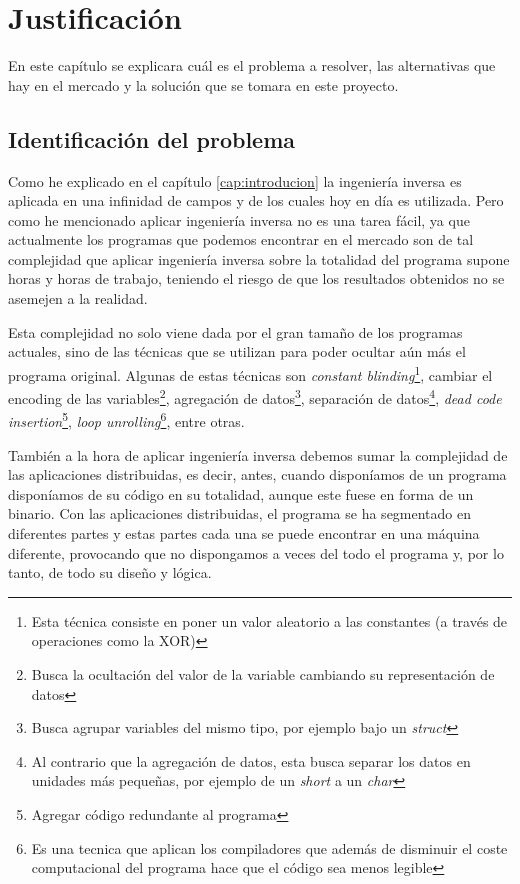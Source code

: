 \chapter{Justificación}
\label{cap:justificacion}


En este capítulo se explicara cuál es el problema a resolver, las alternativas que hay
en el mercado y la solución que se tomara en este proyecto.

\section{Identificación del problema}
\label{sec:problema}


Como he explicado en el capítulo \ref{cap:introducion} la ingeniería inversa es aplicada
en una infinidad de campos y de los cuales hoy en día es utilizada. Pero como he
mencionado aplicar ingeniería inversa no es una tarea fácil, ya que actualmente los
programas que podemos encontrar en el mercado son de tal complejidad que aplicar
ingeniería inversa sobre la totalidad del programa supone horas y horas de trabajo,
teniendo el riesgo de que los resultados obtenidos no se asemejen a la realidad.

Esta complejidad no solo viene dada por el gran tamaño de los programas actuales, sino
de las técnicas que se utilizan para poder ocultar aún más el programa original. Algunas
de estas técnicas son \textit{constant blinding}\footnote{Esta técnica consiste en poner
un valor aleatorio a las constantes (a través de operaciones como la XOR)}, cambiar el
encoding de las variables\footnote{Busca la ocultación del valor de la variable cambiando
su representación de datos}, agregación de datos\footnote{Busca agrupar variables del mismo
tipo, por ejemplo bajo un \textit{struct}}, separación de datos\footnote{Al contrario que
la agregación de datos, esta busca separar los datos en unidades más pequeñas, por ejemplo
de un \textit{short} a un \textit{char}}, \textit{dead code insertion}\footnote{Agregar
código redundante al programa}, \textit{loop unrolling}\footnote{Es una tecnica que aplican
los compiladores que además de disminuir el coste computacional del programa hace que el
código sea menos legible}, entre otras. \cite{TecnicasIlegibleBinario}

También a la hora de aplicar ingeniería inversa debemos sumar la complejidad de las aplicaciones
distribuidas, es decir, antes, cuando disponíamos de un programa disponíamos de su código en
su totalidad, aunque este fuese en forma de un binario. Con las aplicaciones distribuidas, el
programa se ha segmentado en diferentes partes y estas partes cada una se puede encontrar en una
máquina diferente, provocando que no dispongamos a veces del todo el programa y, por lo tanto,
de todo su diseño y lógica.

